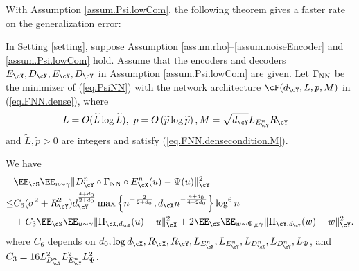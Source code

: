 \documentclass[11pt]{article} %
\begin{document}
 With Assumption \ref{assum.Psi.lowCom}, the following theorem gives a faster rate on the generalization error:
\begin{theorem}\label{thm.general.lowCom}
	In Setting \ref{setting},
	suppose Assumption \ref{assum.rho}--\ref{assum.noiseEncoder} and \ref{assum.Psi.lowCom} hold. Assume that the encoders and decoders $E_{\cX},D_{\cX},E_{\cY}, D_{\cY}$ in Assumption \ref{assum.Psi.lowCom} are given. 
	Let $\Gamma_{\rm NN}$ be the minimizer of (\ref{eq.PsiNN}) with the network architecture $\cF(d_{\cY},L,p,M)$ in (\ref{eq.FNN.dense}), where
	\begin{equation}
		\begin{aligned}
			&L=O(\widetilde{L}\log \widetilde{L}), \ p=O\left(\widetilde{p} \log \widetilde{p}\right), M=\sqrt{d_{\cY}}L_{E^n_{\cY}}R_{\cY}
		\end{aligned}\label{eq.NN.parameter.n.dense.lowCom}
	\end{equation}
	and $\widetilde{L},\widetilde{p}>0$ are integers and satisfy (\ref{eq.FNN.densecondition.M}). %
	
	We have
	\begin{align}
		&\EE_{\cS}\EE_{u\sim \gamma}\|D^n_{\cY}\circ \Gamma_{\rm NN} \circ E^n_{\cX}(u)- \Psi(u)\|_{\cY}^2 \nonumber\\
		\leq& C_{6}(\sigma^2+R_{\cY}^2)d_{\cY}^{\frac{4+d_0}{2+d_0}}\max\left\{n^{-\frac{2}{2+d_0}},d_{\cX}n^{-\frac{4+d_0}{4+2d_0}}\right\}\log^6 n \nonumber\\
		& +  C_3\EE_{\cS}\EE_{u\sim \gamma}\| \Pi_{\cX,d_{\cX}}(u)- u\|_{\cX}^2+2\EE_{\cS}\EE_{w\sim \Psi_{\#}\gamma}\|\Pi_{\cY,d_{\cY}}(w)- w\|_{\cY}^2.
		\label{eq.error.general.dense.lowCom}
	\end{align}
	where $C_{6}$ depends on $d_0,\log d_{\cX}, R_{\cX},  R_{\cY},L_{E^n_{\cX}},L_{E^n_{\cY}},L_{D^n_{\cX}},L_{D^n_{\cY}},L_{\Psi}$, and $C_3=16L_{D^n_{\cY}}^2L_{E^n_{\cY}}^2L_{\Psi}^2$.
	
	
	

\end{theorem}
\end{document}
